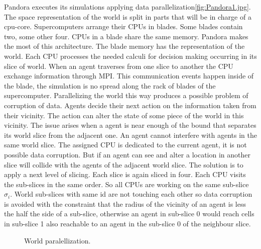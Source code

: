 \documentclass[11pt,oneside,a4paper,openright]{report}
\begin{document}
Pandora executes its simulations applying data parallelization\ref{fig:Pandora1.jpg}. The space representation of the world is split in parts that will be in charge of a cpu-core. Supercomputers arrange their CPUs in blades. Some blades
contain two, some other four. CPUs in a blade share the same memory. Pandora makes the most of this architecture.
The blade memory has the representation of the world. Each CPU processes the needed calculi for decision
making occurring in its slice of world. When an agent traverses from one slice to another the CPU exchange
information through MPI. This communication events happen inside of the blade, the simulation is no spread
along the rack of blades of the supercomputer.
Parallelizing the world this way produces a possible problem of corruption of data. Agents decide their next action
on the information taken from their vicinity. The action can alter the state of some piece of the world in this
vicinity. The issue arises when a agent is near enough of the bound that separates its world slice from the 
adjacent one. An agent cannot interfere with agents in the same world slice. The assigned CPU is dedicated to
the current agent, it is not possible data corruption. But if an agent can see and alter a location in another
slice will collide with the agents of the adjacent world slice. The solution is to apply a next level of slicing.
Each slice is again sliced in four. Each CPU visits the sub-slices in the same order. So all CPUs are working 
on the same sub-slice $\sigma_i$. World sub-slices with same id are not touching each other so data corruption
is avoided with the constraint that the radius of the vicinity of an agent is less the half the side of a sub-slice,
otherwise an agent in sub-slice 0 would reach cells in sub-slice 1 also reachable to an agent in the sub-slice 0
of the neighbour slice. 


\begin{figure}[h!]
\centering
\setlength\fboxsep{0pt}
\setlength\fboxrule{0.5pt}
\caption{ World paralellization.}
\label{fig:Pandora1}
\end{figure}
\end{document}

